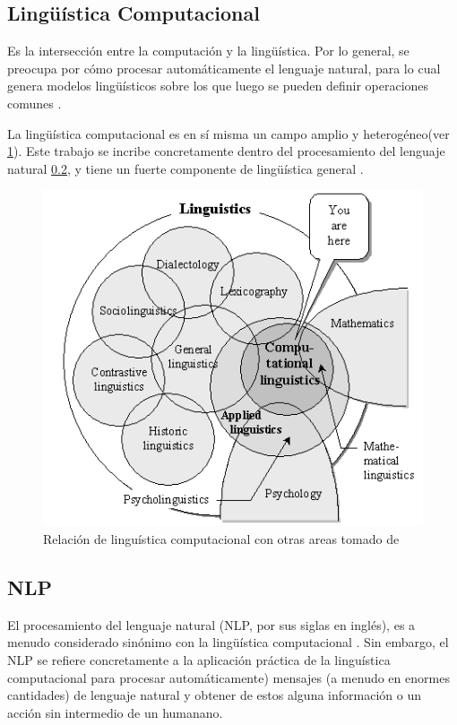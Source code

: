 \documentclass[12pt,letterpaper,twoside]{article}
\begin{document}
\subsection{Lingüística Computacional}
\label{sec:org0f7a47a}

Es la intersección entre la computación y la lingüística. Por lo
general, se preocupa por cómo procesar automáticamente el
lenguaje natural, para lo cual genera modelos lingüísticos sobre los
que luego se pueden definir operaciones comunes \cite{gelbukh2004}.


La lingüística computacional es en sí misma un campo amplio y
heterogéneo(ver \ref{fig:orgcfdca30}).
Este trabajo se incribe concretamente dentro del procesamiento
del lenguaje natural \ref{sec:org3740d60}, y tiene un fuerte componente de
lingüística general .

\begin{figure}[htbp]
\centering
\includegraphics[width=.9\linewidth]{./assets/mapa_linguistica.png}
\caption{\label{fig:orgcfdca30}Relación de linguística computacional con otras areas tomado de \cite{gelbukh2004}}
\end{figure}


\subsection{NLP}
\label{sec:org3740d60}
El procesamiento del lenguaje natural (NLP, por sus siglas en
inglés), es a menudo considerado sinónimo con la lingüística
computacional \cite{gelbukh2004}.  Sin embargo, el NLP se refiere
concretamente a la aplicación práctica de la linguística
computacional para procesar automáticamente) mensajes (a menudo en
enormes cantidades) de lenguaje natural y obtener de estos alguna
información o un acción sin intermedio de un humanano.
\end{document}
